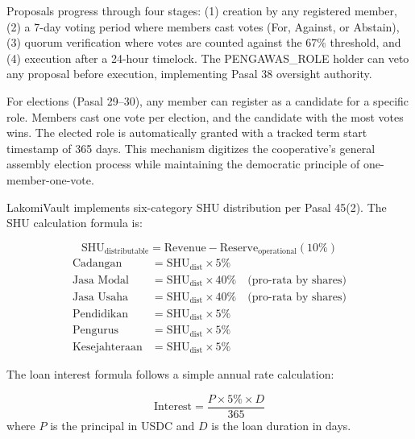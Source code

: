 \documentclass[conference]{IEEEtran}
\begin{document}
Proposals progress through four stages: (1) creation by any registered member, (2) a 7-day voting period where members cast votes (For, Against, or Abstain), (3) quorum verification where votes are counted against the 67\% threshold, and (4) execution after a 24-hour timelock. The PENGAWAS\_ROLE holder can veto any proposal before execution, implementing Pasal 38 oversight authority.

For elections (Pasal 29--30), any member can register as a candidate for a specific role. Members cast one vote per election, and the candidate with the most votes wins. The elected role is automatically granted with a tracked term start timestamp of 365 days. This mechanism digitizes the cooperative's general assembly election process while maintaining the democratic principle of one-member-one-vote.

LakomiVault implements six-category SHU distribution per Pasal 45(2). The SHU calculation formula is:

\begin{mdframed}[backgroundcolor=black!5,linewidth=0pt]
\begin{equation}
\text{SHU}_{\text{distributable}} = \text{Revenue} - \text{Reserve}_{\text{operational}}(10\%)
\label{eq:shu}
\end{equation}
\begin{equation}
\begin{aligned}
\text{Cadangan} &= \text{SHU}_{\text{dist}} \times 5\% \\
\text{Jasa Modal} &= \text{SHU}_{\text{dist}} \times 40\% \quad \text{(pro-rata by shares)} \\
\text{Jasa Usaha} &= \text{SHU}_{\text{dist}} \times 40\% \quad \text{(pro-rata by shares)} \\
\text{Pendidikan} &= \text{SHU}_{\text{dist}} \times 5\% \\
\text{Pengurus} &= \text{SHU}_{\text{dist}} \times 5\% \\
\text{Kesejahteraan} &= \text{SHU}_{\text{dist}} \times 5\%
\end{aligned}
\label{eq:shu-split}
\end{equation}
\end{mdframed}

The loan interest formula follows a simple annual rate calculation:

\begin{mdframed}[backgroundcolor=black!5,linewidth=0pt]
\begin{equation}
\text{Interest} = \frac{P \times 5\% \times D}{365}
\label{eq:interest}
\end{equation}
where $P$ is the principal in USDC and $D$ is the loan duration in days.
\end{mdframed}
\end{document}
